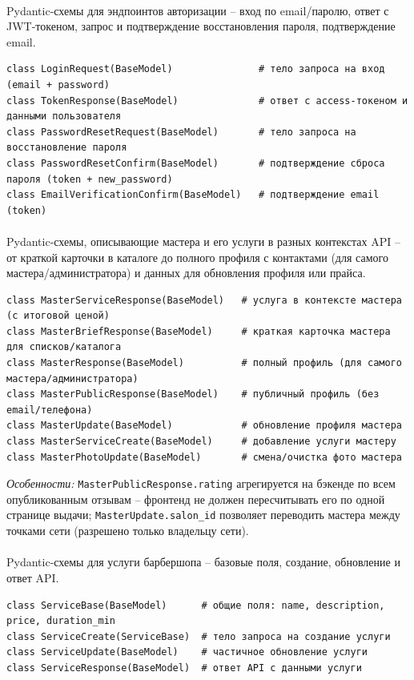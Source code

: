\paragraph{}
Pydantic-схемы для эндпоинтов авторизации -- вход по email/паролю, ответ
с JWT-токеном, запрос и подтверждение восстановления пароля,
подтверждение email.
\begin{verbatim}
class LoginRequest(BaseModel)               # тело запроса на вход (email + password)
class TokenResponse(BaseModel)              # ответ с access-токеном и данными пользователя
class PasswordResetRequest(BaseModel)       # тело запроса на восстановление пароля
class PasswordResetConfirm(BaseModel)       # подтверждение сброса пароля (token + new_password)
class EmailVerificationConfirm(BaseModel)   # подтверждение email (token)
\end{verbatim}

\paragraph{}
Pydantic-схемы, описывающие мастера и его услуги в разных контекстах
API -- от краткой карточки в каталоге до полного профиля с контактами
(для самого мастера/администратора) и данных для обновления профиля или
прайса.
\begin{verbatim}
class MasterServiceResponse(BaseModel)   # услуга в контексте мастера (с итоговой ценой)
class MasterBriefResponse(BaseModel)     # краткая карточка мастера для списков/каталога
class MasterResponse(BaseModel)          # полный профиль (для самого мастера/администратора)
class MasterPublicResponse(BaseModel)    # публичный профиль (без email/телефона)
class MasterUpdate(BaseModel)            # обновление профиля мастера
class MasterServiceCreate(BaseModel)     # добавление услуги мастеру
class MasterPhotoUpdate(BaseModel)       # смена/очистка фото мастера
\end{verbatim}
\textit{Особенности:} \texttt{MasterPublicResponse.rating} агрегируется
на бэкенде по всем опубликованным отзывам -- фронтенд не должен
пересчитывать его по одной странице выдачи; \texttt{MasterUpdate.salon_id}
позволяет переводить мастера между точками сети (разрешено только
владельцу сети).

\paragraph{}
Pydantic-схемы для услуги барбершопа -- базовые поля, создание,
обновление и ответ API.
\begin{verbatim}
class ServiceBase(BaseModel)      # общие поля: name, description, price, duration_min
class ServiceCreate(ServiceBase)  # тело запроса на создание услуги
class ServiceUpdate(BaseModel)    # частичное обновление услуги
class ServiceResponse(BaseModel)  # ответ API с данными услуги
\end{verbatim}


